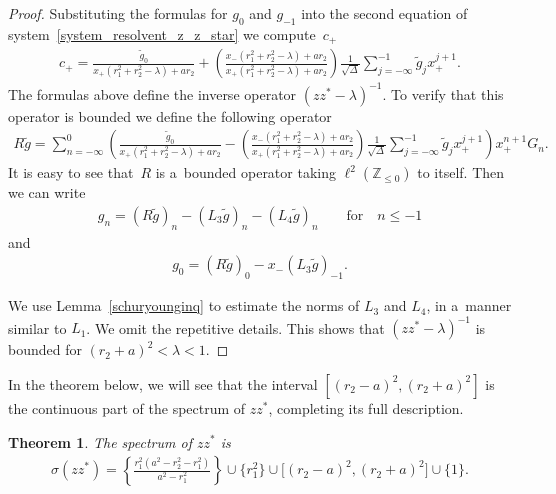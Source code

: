 \documentclass[pdftex]{sigma}
\numberwithin{equation}{section}
\newtheorem{Theorem}{Theorem}[section]
\begin{document}
\begin{proof}
Substituting the formulas for $g_{0}$ and $g_{-1}$ into the second equation of system~\eqref{system_resolvent_z_z_star}
we com\-pu\-te~$c_+$
\begin{gather*}
c_+=\frac{\tilde{g}_0}{x_+(r_1^2+r_2^2-\lambda)+ar_2}+\left(\frac{{x_-(r_1^2+r_2^2-\lambda)+ar_2}}{x_+(r_1^2
+r_2^2-\lambda)+ar_2}\right) \frac{1}{\sqrt{\Delta}}\sum\limits_{j=-\infty}^{-1}\tilde{g}_jx_+^{j+1}.
\end{gather*}
The formulas above def\/ine the inverse operator $(zz^*-\lambda)^{-1}$.
To verify that this operator is bounded we def\/ine the following operator
\begin{gather*}
R\tilde{g}=\!\sum\limits_{n=-\infty}^0\!\!\left(\!\frac{\tilde{g}_0}{x_+(r_1^2+r_2^2-\lambda)+ar_2}-
\left(\frac{{x_-(r_1^2+r_2^2-\lambda)+ar_2}}{x_+(r_1^2+r_2^2-\lambda)+ar_2}\right)\!
\frac{1}{\sqrt{\Delta}}\sum\limits_{j=-\infty}^{-1}\!\!\tilde{g}_jx_+^{j+1}\!\right)\!x_+^{n+1}G_n.
\end{gather*}
It is easy to see that~$R$ is a~bounded operator taking $\ell^2({\mathbb Z}_{\leq 0})$ to itself.
Then we can write
\begin{gather*}
g_n=\left(R\tilde{g}\right)_n-\left(L_3\tilde{g}\right)_n-\left(L_4\tilde{g}\right)_n \qquad\text{for}\quad  n\leq -1
\end{gather*}
and
\begin{gather*}
g_0 =\left(R\tilde{g}\right)_0-x_-\left(L_3\tilde{g}\right)_{-1}.
\end{gather*}

We use Lemma~\ref{schuryounginq} to estimate the norms of $L_3$ and $L_4$, in a~manner similar to $L_1$.
We omit the repetitive details.
This shows that $(zz^*-\lambda)^{-1}$ is bounded for $(r_2+a)^2<\lambda<1$.
\end{proof}

In the theorem below, we will see that the interval $[(r_2-a)^2,(r_2+a)^2]$ is the continuous part of the spectrum of
$zz^*$, completing its full description.

\begin{Theorem}
The spectrum of $zz^*$ is
\begin{gather*}
\sigma(zz^*)= \left\{\frac{r_1^2(a^2-r_2^2-r_1^2)}{a^2-r_1^2}\right\}\cup\big\{r_1^2\big\}\cup \big[(r_2-a)^2,(r_2+a)^2\big]\cup\{1\}.
\end{gather*}
\end{Theorem}
\end{document}
